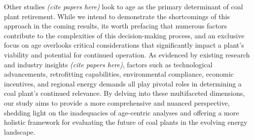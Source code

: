 Other studies \textit{(cite papers here)} look to age as the primary determinant of coal plant retirement. While we intend to demonstrate the shortcomings of this approach 
in the coming results, its worth prefacing that numerous factors contribute to the complexities of this decision-making process, and an exclusive focus on age overlooks 
critical considerations that significantly impact a plant's viability and potential for continued operation. As evidenced by existing research and industry insights \textit{(cite papers here)}, 
factors such as technological advancements, retrofitting capabilities, environmental compliance, economic incentives, and regional energy demands all play pivotal roles 
in determining a coal plant's continued relevance. By delving into these multifaceted dimensions, our study aims to provide a more comprehensive and nuanced perspective, 
shedding light on the inadequacies of age-centric analyses and offering a more holistic framework for evaluating the future of coal plants in the evolving energy landscape.



